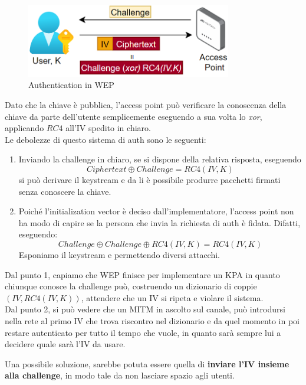 \begin{figure}[h]
    \centering
    \includegraphics[width=0.8\textwidth]{image/wepchallenge.png}
    \caption{Authentication in WEP}
    \label{fig:wepchallenge}
\end{figure}
Dato che la chiave è pubblica, l'access point può verificare la conoscenza della chiave da parte dell'utente semplicemente eseguendo a sua volta lo \textit{xor}, applicando $RC4$ all'IV spedito in chiaro.\\
Le debolezze di questo sistema di auth sono le seguenti:
\begin{enumerate}
    \item Inviando la challenge in chiaro, se si dispone della relativa risposta, eseguendo \[Ciphertext\oplus{Challenge}=RC4(IV,K)\]
    si può derivare il keystream e da li è possibile produrre pacchetti firmati senza conoscere la chiave.
    \item Poiché l'initialization vector è deciso dall'implementatore, l'access point non ha modo di capire se la persona che invia la richiesta di auth è fidata. Difatti, eseguendo:
    \[
    Challenge\oplus{Challenge\oplus{RC4(IV,K)}}=RC4(IV,K)
    \]
    Esponiamo il keystream e permettendo diversi attacchi.
\end{enumerate}
Dal punto 1, capiamo che WEP finisce per implementare un KPA in quanto chiunque conosce la challenge può, costruendo un dizionario di coppie $(IV,RC4(IV,K))$, attendere che un IV si ripeta e violare il sistema.\\
Dal punto 2, si può vedere che un MITM in ascolto sul canale, può introdursi nella rete al primo IV che trova riscontro nel dizionario e da quel momento in poi restare autenticato per tutto il tempo che vuole, in quanto sarà sempre lui a decidere quale sarà l'IV da usare.\\
\begin{remark}
Una possibile soluzione, sarebbe potuta essere quella di \textbf{inviare l'IV insieme alla challenge}, in modo tale da non lasciare spazio agli utenti.
\end{remark}

